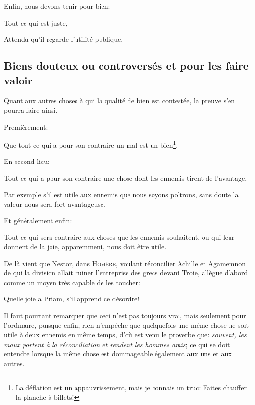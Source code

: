 \bigbreak

Enfin, nous devons tenir pour bien:

\begin{lieu}
	Tout ce qui est juste,
\end{lieu}

Attendu qu'il regarde l'utilité publique.

\subsection{Biens douteux ou controversés et pour les faire valoir}

Quant aux autres choses à qui la qualité de bien est contestée, la preuve s'en pourra faire ainsi.

\bigbreak

Premièrement:

\begin{lieu}
	Que tout ce qui a pour son contraire un mal est un bien\footnote{La déflation est un appauvrissement, mais je
	connais un truc: Faites chauffer la planche à billets!}. 
\end{lieu}

En second lieu:

\begin{lieu}
	Tout ce qui a pour son contraire une chose dont les ennemis tirent de l'avantage,
\end{lieu}

Par exemple s'il est utile aux ennemis que nous soyons poltrons, sans doute la valeur nous sera fort avantageuse.

Et généralement enfin:

\begin{lieu}
	Tout ce qui sera contraire aux choses que les ennemis souhaitent, ou qui leur donnent de la joie, apparemment,
	nous doit être utile.
\end{lieu}

De là vient que Nestor, dans \textsc{Homère}, voulant réconcilier Achille et Agamemnon de qui la division allait ruiner
l'entreprise des grecs devant Troie, allègue d'abord comme un moyen très capable de les toucher:

\begin{emphpar}
	Quelle joie a Priam, s'il apprend ce désordre!
\end{emphpar}

Il faut pourtant remarquer que ceci n'est pas toujours vrai, mais seulement pour l'ordinaire, puisque enfin, rien
n'empêche que quelquefois une même chose ne soit utile à deux ennemis en même temps, d'où est venu le proverbe que:
\emph{souvent, les maux portent à la réconciliation et rendent les hommes amis}; ce qui se doit entendre lorsque la
même chose est dommageable également aux uns et aux autres.

